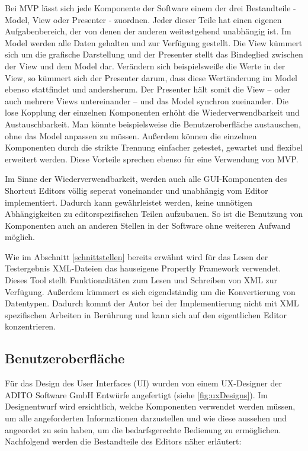 Bei MVP lässt sich jede Komponente der Software einem der drei Bestandteile - Model, View oder Presenter - zuordnen. Jeder dieser Teile hat einen eigenen Aufgabenbereich, der von denen der anderen weitestgehend unabhängig ist. Im Model werden alle Daten gehalten und zur Verfügung gestellt. Die View kümmert sich um die grafische Darstellung und der Presenter stellt das Bindeglied zwischen der View und dem Model dar. Verändern sich beispielsweiße die Werte in der View, so kümmert sich der Presenter darum, dass diese Wertänderung im Model ebenso stattfindet und andersherum. Der Presenter hält somit die View -- oder auch mehrere Views untereinander -- und das Model synchron zueinander. Die lose Kopplung der einzelnen Komponenten erhöht die Wiederverwendbarkeit und Austauschbarkeit. Man könnte beispielsweise die Benutzeroberfläche austauschen, ohne das Model anpassen zu müssen. Außerdem können die einzelnen Komponenten durch die strikte Trennung einfacher getestet, gewartet und flexibel erweitert werden. Diese Vorteile sprechen ebenso für eine Verwendung von MVP.

Im Sinne der Wiederverwendbarkeit, werden auch alle GUI-Komponenten des Shortcut Editors völlig seperat voneinander und unabhängig vom Editor implementiert. Dadurch kann gewährleistet werden, keine unnötigen Abhängigkeiten zu editorspezifischen Teilen aufzubauen. So ist die Benutzung von Komponenten auch an anderen Stellen in der Software ohne weiteren Aufwand möglich.

Wie im Abschnitt \ref{schnittstellen} bereits erwähnt wird für das Lesen der Testergebnis XML-Dateien das hauseigene Propertly Framework verwendet. Dieses Tool stellt Funktionalitäten zum Lesen und Schreiben von XML zur Verfügung. Außerdem kümmert es sich eigendständig um die Konvertierung von Datentypen. Dadurch kommt der Autor bei der Implementierung nicht mit XML spezifischen Arbeiten in Berührung und kann sich auf den eigentlichen Editor konzentrieren.

\newpage

\subsection{Benutzeroberfläche}

Für das Design des User Interfaces (UI) wurden von einem UX-Designer der ADITO Software GmbH Entwürfe angefertigt (siehe \autoref{fig:uxDesigns}). Im Designentwurf wird ersichtlich, welche Komponenten verwendet werden müssen, um alle angeforderten Informationen darzustellen und wie diese aussehen und angeordet zu sein haben, um die bedarfsgerechte Bedienung zu ermöglichen. Nachfolgend werden die Bestandteile des Editors näher erläutert:

